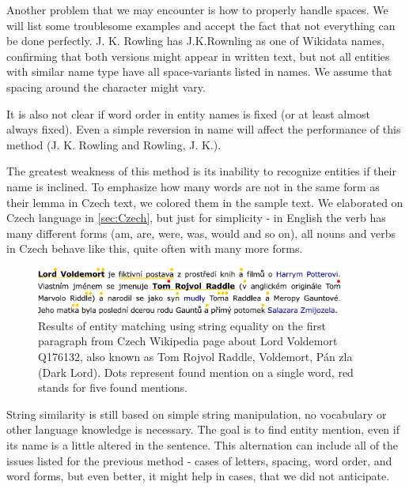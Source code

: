 Another problem that we may encounter is how to properly handle spaces. We will list some troublesome examples and accept the fact that not everything can be done perfectly. J. K. Rowling has J.K.Rownling as one of Wikidata names, confirming that both versions might appear in written text, but not all entities with similar name type have all space-variants listed in names. We assume that spacing around the \vuvozovkach{-} character might vary.

It is also not clear if word order in entity names is fixed (or at least almost always fixed). Even a simple reversion in name will affect the performance of this method (J. K. Rowling and Rowling, J. K.).

The greatest weakness of this method is its inability to recognize entities if their name is inclined. To emphasize how many words are not in the same form as their lemma in Czech text, we colored them in the sample text.  We elaborated on Czech language in \autoref{sec:Czech}, but just for simplicity - in English the verb  has many different forms (am, are, were, was, would and so on), all nouns and verbs in Czech behave like this, quite often with many more forms.


\begin{figure}[h]

\centering
\includegraphics[width = 0.9\textwidth]{./img/Voldemort_string_equality}

\caption{Results of entity matching using string equality on the first paragraph from Czech Wikipedia page about Lord Voldemort Q176132, also known as Tom Rojvol Raddle, Voldemort, Pán zla (Dark Lord). Dots represent found mention on a single word, red stands for five found mentions. }

\end{figure}

 String similarity is still based on simple string manipulation, no vocabulary or other language knowledge is necessary. The goal is to find entity mention, even if its name is a little altered in the sentence. This alternation can include all of the issues listed for the previous method - cases of letters, spacing, word order, and word forms, but even better, it might help in cases, that we did not anticipate.

